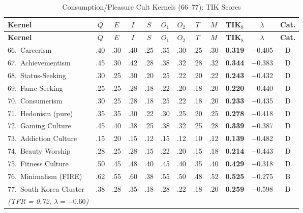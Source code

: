 \documentclass[11pt,a4paper]{article}
\theoremstyle{definition}
\theoremstyle{remark}
\begin{document}
\begin{longtable}{@{}l|cccccccc|cc|c@{}}
\caption{Consumption/Pleasure Cult Kernels (66--77): TIK Scores}
\label{tab:consumption}\\
\toprule
\textbf{Kernel} &
$Q$ & $E$ & $I$ & $S$ & $O_1$ & $O_2$ & $T$ & $M$ &
\textbf{TIK$_8$} & $\lambda$ & \textbf{Cat.} \\
\midrule
\endfirsthead
\toprule
\textbf{Kernel} &
$Q$ & $E$ & $I$ & $S$ & $O_1$ & $O_2$ & $T$ & $M$ &
\textbf{TIK$_8$} & $\lambda$ & \textbf{Cat.} \\
\midrule
\endhead
\bottomrule
\endlastfoot

66.\ Careerism
  & .40 & .30 & .40 & .25 & .35 & .30 & .25 & .30
  & \textbf{0.319} & $-$0.405 & \textcolor{collapse}{D} \\
67.\ Achievementism
  & .45 & .30 & .42 & .28 & .38 & .32 & .28 & .32
  & \textbf{0.344} & $-$0.383 & \textcolor{collapse}{D} \\
68.\ Status-Seeking
  & .30 & .25 & .30 & .20 & .25 & .22 & .20 & .22
  & \textbf{0.243} & $-$0.432 & \textcolor{collapse}{D} \\
69.\ Fame-Seeking
  & .25 & .25 & .28 & .18 & .22 & .20 & .18 & .20
  & \textbf{0.220} & $-$0.440 & \textcolor{collapse}{D} \\
70.\ Consumerism
  & .30 & .25 & .28 & .18 & .25 & .22 & .18 & .20
  & \textbf{0.233} & $-$0.435 & \textcolor{collapse}{D} \\
71.\ Hedonism (pure)
  & .35 & .35 & .30 & .22 & .30 & .25 & .20 & .25
  & \textbf{0.278} & $-$0.418 & \textcolor{collapse}{D} \\
72.\ Gaming Culture
  & .45 & .40 & .38 & .25 & .38 & .32 & .25 & .28
  & \textbf{0.339} & $-$0.387 & \textcolor{collapse}{D} \\
73.\ Addiction Culture
  & .15 & .20 & .15 & .12 & .15 & .12 & .10 & .12
  & \textbf{0.139} & $-$0.482 & \textcolor{collapse}{D} \\
74.\ Beauty Worship
  & .28 & .25 & .28 & .15 & .22 & .20 & .15 & .18
  & \textbf{0.214} & $-$0.443 & \textcolor{collapse}{D} \\
75.\ Fitness Culture
  & .50 & .45 & .48 & .40 & .45 & .40 & .35 & .40
  & \textbf{0.429} & $-$0.318 & \textcolor{collapse}{D} \\
76.\ Minimalism (FIRE)
  & .62 & .55 & .60 & .38 & .55 & .50 & .48 & .52
  & \textbf{0.525} & $-$0.275 & \textcolor{borderline}{B} \\
77.\ South Korea Cluster
  & .38 & .28 & .35 & .18 & .28 & .22 & .18 & .20
  & \textbf{0.259} & $-$0.598 & \textcolor{collapse}{D} \\
\quad\textit{\small(TFR = 0.72, $\lambda = -0.60$)} & & & & & & & & & & & \\

\end{longtable}
\end{document}
